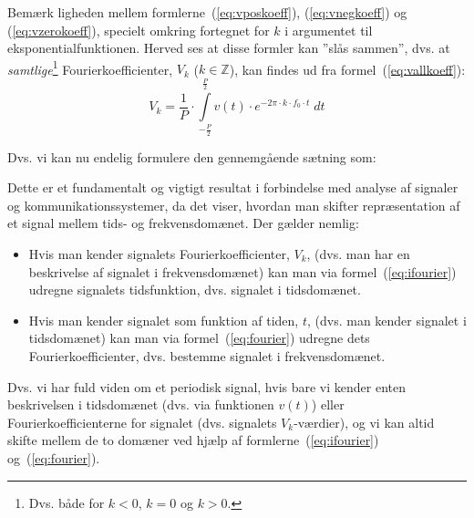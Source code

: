 \documentclass[11pt,a4paper]{article}
\begin{document}
Bemærk ligheden mellem formlerne~(\ref{eq:vposkoeff}), (\ref{eq:vnegkoeff}) og (\ref{eq:vzerokoeff}), specielt omkring fortegnet for $k$ i argumentet til eksponentialfunktionen. Herved ses at disse formler kan ''slås sammen'', dvs. at \emph{samtlige}\footnote{Dvs. både for $k<0$, $k=0$ og $k>0$.} Fourierkoefficienter, $V_k$ ($k\in\mathbb{Z}$), kan findes ud fra formel~(\ref{eq:vallkoeff}):
\begin{equation}
V_k = \frac{1}{P}\cdot\int\limits_{-\frac{P}{2}}^{\frac{P}{2}}v(t)\cdot{}e^{-2\pi\cdot{}k\cdot{}f_0\cdot{}t}\;dt\label{eq:vallkoeff}
\end{equation}

\noindent{}Dvs. vi kan nu endelig formulere den gennemgående sætning som:

\vspace{\baselineskip}\vspace{\baselineskip}

\noindent{}Dette er et fundamentalt og vigtigt resultat i forbindelse med analyse af signaler og kommunikationssystemer, da det viser, hvordan man skifter repræsentation af et signal mellem tids- og frekvensdomænet. Der gælder nemlig:
\begin{itemize}
%
\item Hvis man kender signalets Fourierkoefficienter, $V_k$, (dvs. man har en beskrivelse af signalet i frekvensdomænet) kan man via formel~(\ref{eq:ifourier}) udregne signalets tidsfunktion, dvs. signalet i tidsdomænet.
%
\item Hvis man kender signalet som funktion af tiden, $t$, (dvs. man kender signalet i tidsdomænet) kan man via formel~(\ref{eq:fourier}) udregne dets Fourierkoefficienter, dvs. bestemme signalet i frekvensdomænet.
%
\end{itemize}
\noindent{}Dvs. vi har fuld viden om et periodisk signal, hvis bare vi kender enten beskrivelsen i tidsdomænet (dvs. via funktionen $v(t)$) eller Fourierkoefficienterne for signalet (dvs. signalets $V_k$-værdier), og vi kan altid skifte mellem de to domæner ved hjælp af formlerne~(\ref{eq:ifourier}) og~(\ref{eq:fourier}).
\end{document}
